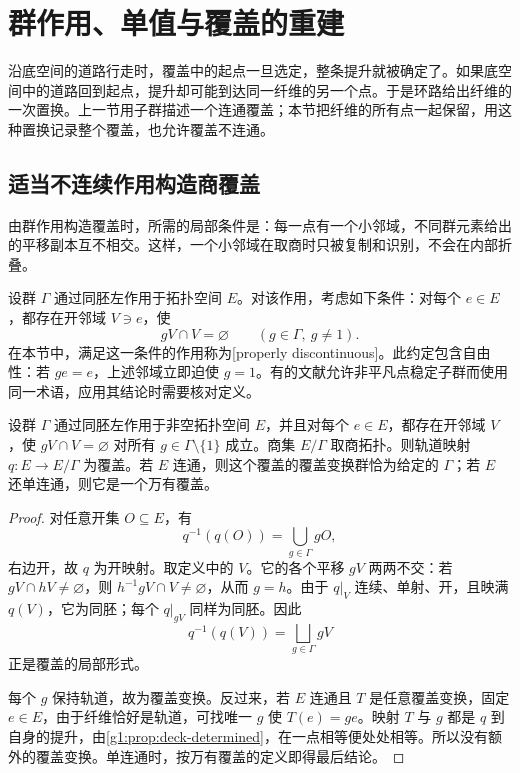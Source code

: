 
% 
% 
% 

\section{群作用、单值与覆盖的重建}
\label{g1:sec:0505}

沿底空间的道路行走时，覆盖中的起点一旦选定，整条提升就被确定了。如果底空间中的道路回到起点，提升却可能到达同一纤维的另一个点。于是环路给出纤维的一次置换。上一节用子群描述一个连通覆盖；本节把纤维的所有点一起保留，用这种置换记录整个覆盖，也允许覆盖不连通。

\subsection{适当不连续作用构造商覆盖}
\label{g1:subsec:0505:01}

由群作用构造覆盖时，所需的局部条件是：每一点有一个小邻域，不同群元素给出的平移副本互不相交。这样，一个小邻域在取商时只被复制和识别，不会在内部折叠。

\begin{definition}\label{g1:def:properly-discontinuous-covering}
	设群 \(\Gamma\) 通过同胚左作用于拓扑空间 \(E\)。对该作用，考虑如下条件：对每个 \(e\in E\)，都存在开邻域 \(V\ni e\)，使
	\[
		gV\cap V=\varnothing\qquad(g\in\Gamma,\ g\ne1).
	\]
	在本节中，满足这一条件的作用称为[properly discontinuous]。此约定包含自由性：若 \(ge=e\)，上述邻域立即迫使 \(g=1\)。有的文献允许非平凡点稳定子群而使用同一术语，应用其结论时需要核对定义。
\end{definition}

\begin{proposition}\label{g1:prop:action-quotient-cover}
	设群 \(\Gamma\) 通过同胚左作用于非空拓扑空间 \(E\)，并且对每个 \(e\in E\)，都存在开邻域 \(V\)，使 \(gV\cap V=\varnothing\) 对所有 \(g\in\Gamma\setminus\{1\}\) 成立。商集 \(E/\Gamma\) 取商拓扑。则轨道映射 \(q:E\rightarrow E/\Gamma\) 为覆盖。若 \(E\) 连通，则这个覆盖的覆盖变换群恰为给定的 \(\Gamma\)；若 \(E\) 还单连通，则它是一个万有覆盖。
\end{proposition}
\begin{proof}
	对任意开集 \(O\subseteq E\)，有
	\[
		q^{-1}(q(O))=\bigcup_{g\in\Gamma}gO,
	\]
	右边开，故 \(q\) 为开映射。取定义中的 \(V\)。它的各个平移 \(gV\) 两两不交：若 \(gV\cap hV\ne\varnothing\)，则 \(h^{-1}gV\cap V\ne\varnothing\)，从而 \(g=h\)。由于 \(q|_V\) 连续、单射、开，且映满 \(q(V)\)，它为同胚；每个 \(q|_{gV}\) 同样为同胚。因此
	\[
		q^{-1}(q(V))=\bigsqcup_{g\in\Gamma}gV
	\]
	正是覆盖的局部形式。

	每个 \(g\) 保持轨道，故为覆盖变换。反过来，若 \(E\) 连通且 \(T\) 是任意覆盖变换，固定 \(e\in E\)，由于纤维恰好是轨道，可找唯一 \(g\) 使 \(T(e)=ge\)。映射 \(T\) 与 \(g\) 都是 \(q\) 到自身的提升，由\cref{g1:prop:deck-determined}，在一点相等便处处相等。所以没有额外的覆盖变换。单连通时，按万有覆盖的定义即得最后结论。
\end{proof}

